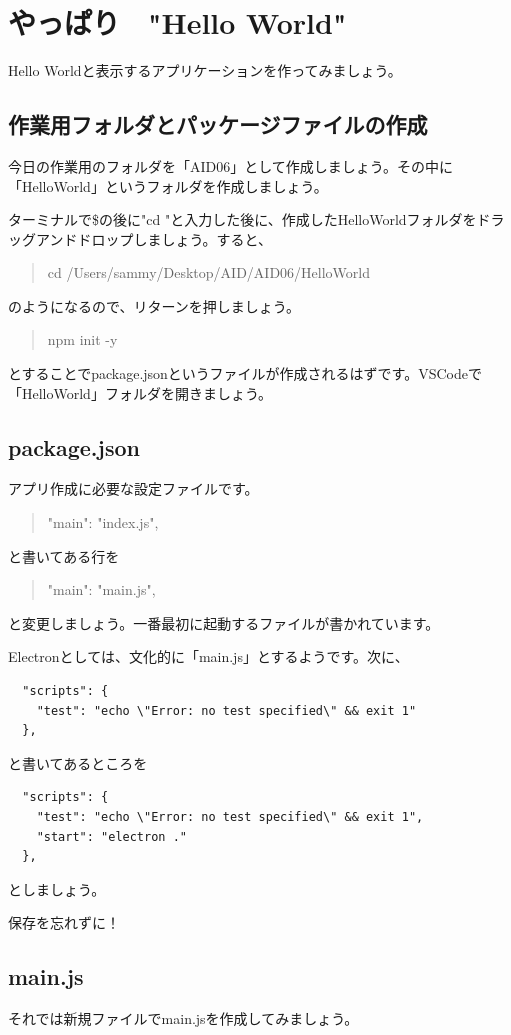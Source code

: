 \documentclass[mingoth,11pt,a4j,uplatex]{jsarticle}
\begin{document}
\section{やっぱり　"Hello World"}
Hello Worldと表示するアプリケーションを作ってみましょう。

\subsection{作業用フォルダとパッケージファイルの作成}
今日の作業用のフォルダを「AID06」として作成しましょう。その中に「HelloWorld」というフォルダを作成しましょう。

ターミナルで\$の後に"cd "と入力した後に、作成したHelloWorldフォルダをドラッグアンドドロップしましょう。すると、
\begin{quote}
cd /Users/sammy/Desktop/AID/AID06/HelloWorld 
\end{quote}
のようになるので、リターンを押しましょう。

\begin{quote}
npm init -y
\end{quote}
とすることでpackage.jsonというファイルが作成されるはずです。VSCodeで「HelloWorld」フォルダを開きましょう。

\subsection{package.json}
アプリ作成に必要な設定ファイルです。
\begin{quote}
  "main": "index.js",
\end{quote}
と書いてある行を
\begin{quote}
  "main": "main.js",
\end{quote}
と変更しましょう。一番最初に起動するファイルが書かれています。

Electronとしては、文化的に「main.js」とするようです。次に、

\begin{verbatim}
  "scripts": {
    "test": "echo \"Error: no test specified\" && exit 1"
  },
\end{verbatim}
と書いてあるところを
\begin{verbatim}
  "scripts": {
    "test": "echo \"Error: no test specified\" && exit 1",
    "start": "electron ."
  },
\end{verbatim}
としましょう。




保存を忘れずに！

\subsection{main.js}
それでは新規ファイルでmain.jsを作成してみましょう。
\end{document}
